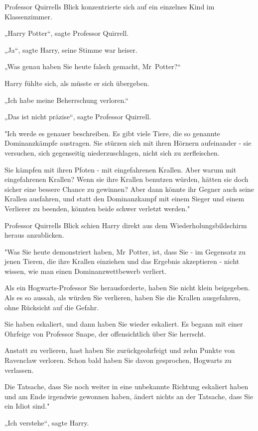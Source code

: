 {Professor Quirrells Blick konzentrierte sich auf ein einzelnes Kind im Klassenzimmer.

„Harry Potter“, sagte Professor Quirrell.

„Ja“, sagte Harry, seine Stimme war heiser.

„Was genau haben Sie heute falsch gemacht, Mr~Potter?“

Harry fühlte sich, als müsste er sich übergeben.

„Ich habe meine Beherrschung verloren.“

„Das ist nicht präzise“, sagte Professor Quirrell.

"Ich werde es genauer beschreiben. Es gibt viele Tiere, die so genannte Dominanzkämpfe austragen. Sie stürzen sich mit ihren Hörnern aufeinander - sie versuchen, sich gegenseitig niederzuschlagen, nicht sich zu zerfleischen.

Sie kämpfen mit ihren Pfoten - mit eingefahrenen Krallen. Aber warum mit eingefahrenen Krallen? Wenn sie ihre Krallen benutzen würden, hätten sie doch sicher eine bessere Chance zu gewinnen? Aber dann könnte ihr Gegner auch seine Krallen ausfahren, und statt den Dominanzkampf mit einem Sieger und einem Verlierer zu beenden, könnten beide schwer verletzt werden."

Professor Quirrells Blick schien Harry direkt aus dem Wiederholungsbildschirm heraus anzublicken.

"Was Sie heute demonstriert haben, Mr~Potter, ist, dass Sie - im Gegensatz zu jenen Tieren, die ihre Krallen einziehen und das Ergebnis akzeptieren - nicht wissen, wie man einen Dominanzwettbewerb verliert.

Als ein Hogwarts-Professor Sie herausforderte, haben Sie nicht klein beigegeben. Als es so aussah, als würden Sie verlieren, haben Sie die Krallen ausgefahren, ohne Rücksicht auf die Gefahr.

Sie haben eskaliert, und dann haben Sie wieder eskaliert. Es begann mit einer Ohrfeige von Professor Snape, der offensichtlich über Sie herrscht.

Anstatt zu verlieren, hast haben Sie zurückgeohrfeigt und zehn Punkte von Ravenclaw verloren. Schon bald haben Sie davon gesprochen, Hogwarts zu verlassen.

Die Tatsache, dass Sie noch weiter in eine unbekannte Richtung eskaliert haben und am Ende irgendwie gewonnen haben, ändert nichts an der Tatsache, dass Sie ein Idiot sind."

„Ich verstehe“, sagte Harry.

}
